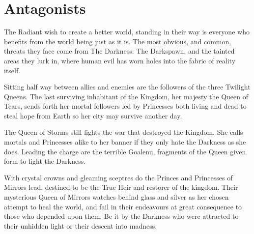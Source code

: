 \section*{Antagonists}

The Radiant wish to create a better world, standing in their way is everyone who benefits from the world being just as it is. The most obvious, and common, threats they face come from The Darkness: The Darkspawn, and the tainted areas they lurk in, where human evil has worn holes into the fabric of reality itself. 

Sitting half way between allies and enemies are the followers of the three Twilight Queens. The last surviving inhabitant of the Kingdom, her majesty the Queen of Tears, sends forth her mortal followers led by Princesses both living and dead to steal hope from Earth so her city may survive another day. 

The Queen of Storms still fights the war that destroyed the Kingdom. She calls mortals and Princesses alike to her banner if they only hate the Darkness as she does. Leading the charge are the terrible Goalenu, fragments of the Queen given form to fight the Darkness. 

With crystal crowns and gleaming sceptres do the Princes and Princesses of Mirrors lead, destined to be the True Heir and restorer of the kingdom. Their mysterious Queen of Mirrors watches behind glass and silver as her chosen attempt to heal the world, and fail in their endeavours at great consequence to those who depended upon them. Be it by the Darkness who were attracted to their unhidden light or their descent into madness.

